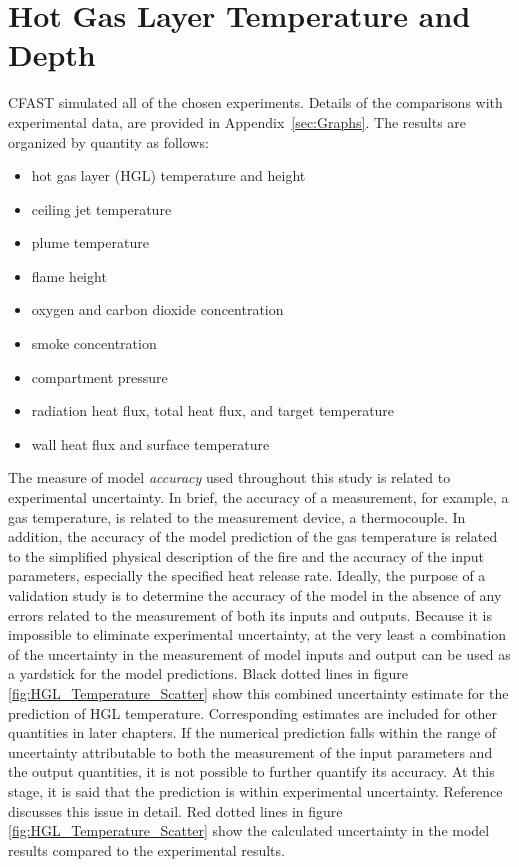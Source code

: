 
\chapter{Hot Gas Layer Temperature and Depth}

\label{HGL:Chapter}

CFAST simulated all of the chosen experiments.  Details of the comparisons with experimental data, are provided in Appendix~\ref{sec:Graphs}.  The results are organized by quantity as follows:

\begin{itemize}
\item hot gas layer (HGL) temperature and height
\item ceiling jet temperature
\item plume temperature
\item flame height
\item oxygen and carbon dioxide concentration
\item smoke concentration
\item compartment pressure
\item radiation heat flux, total heat flux, and target temperature
\item wall heat flux and surface temperature
\end{itemize}

The measure of model \emph{accuracy} used throughout this study is related to experimental uncertainty. In brief, the accuracy of a measurement, for example, a gas temperature, is related to the measurement device, a thermocouple. In addition, the accuracy of the model prediction of the gas temperature is related to the simplified physical description of the fire and the accuracy of the input parameters, especially the specified heat release rate. Ideally, the purpose of a validation study is to determine the accuracy of the model in the absence of any errors related to the measurement of both its inputs and outputs. Because it is impossible to eliminate experimental uncertainty, at the very least a combination of the uncertainty in the measurement of model inputs and output can be used as a yardstick for the model predictions. Black dotted lines in figure \ref{fig:HGL_Temperature_Scatter} show this combined uncertainty estimate for the prediction of HGL temperature. Corresponding estimates are included for other quantities in later chapters. If the numerical prediction falls within the range of uncertainty attributable to both the measurement of the input parameters and the output quantities, it is not possible to further quantify its accuracy. At this stage, it is said that the prediction is within experimental uncertainty. Reference \cite{NRCNUREG1824}  discusses this issue in detail. Red dotted lines in figure \ref{fig:HGL_Temperature_Scatter} show the calculated uncertainty in the model results compared to the experimental results.

